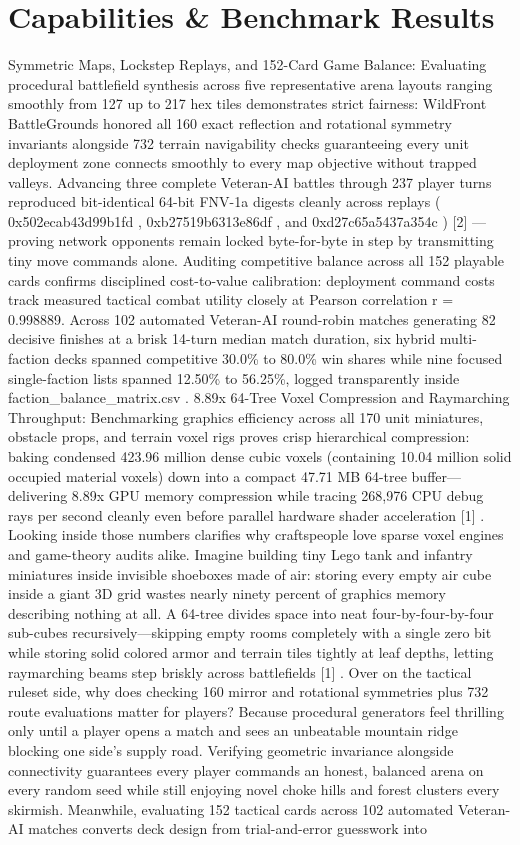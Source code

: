 \documentclass[10pt,letterpaper]{article}
\begin{document}
\section{Capabilities \& Benchmark Results}
Symmetric Maps, Lockstep Replays, and 152-Card Game Balance: Evaluating procedural battlefield synthesis across five representative arena layouts ranging smoothly from 127 up to 217 hex tiles demonstrates strict fairness: WildFront BattleGrounds honored all 160 exact reflection and rotational symmetry invariants alongside 732 terrain navigability checks guaranteeing every unit deployment zone connects smoothly to every map objective without trapped valleys. Advancing three complete Veteran-AI battles through 237 player turns reproduced bit-identical 64-bit FNV-1a digests cleanly across replays ( 0x502ecab43d99b1fd , 0xb27519b6313e86df , and 0xd27c65a5437a354c ) [2] ---proving network opponents remain locked byte-for-byte in step by transmitting tiny move commands alone. Auditing competitive balance across all 152 playable cards confirms disciplined cost-to-value calibration: deployment command costs track measured tactical combat utility closely at Pearson correlation r = 0.998889. Across 102 automated Veteran-AI round-robin matches generating 82 decisive finishes at a brisk 14-turn median match duration, six hybrid multi-faction decks spanned competitive 30.0\% to 80.0\% win shares while nine focused single-faction lists spanned 12.50\% to 56.25\%, logged transparently inside faction\_balance\_matrix.csv . 8.89x 64-Tree Voxel Compression and Raymarching Throughput: Benchmarking graphics efficiency across all 170 unit miniatures, obstacle props, and terrain voxel rigs proves crisp hierarchical compression: baking condensed 423.96 million dense cubic voxels (containing 10.04 million solid occupied material voxels) down into a compact 47.71 MB 64-tree buffer---delivering 8.89x GPU memory compression while tracing 268,976 CPU debug rays per second cleanly even before parallel hardware shader acceleration [1] . Looking inside those numbers clarifies why craftspeople love sparse voxel engines and game-theory audits alike. Imagine building tiny Lego tank and infantry miniatures inside invisible shoeboxes made of air: storing every empty air cube inside a giant 3D grid wastes nearly ninety percent of graphics memory describing nothing at all. A 64-tree divides space into neat four-by-four-by-four sub-cubes recursively---skipping empty rooms completely with a single zero bit while storing solid colored armor and terrain tiles tightly at leaf depths, letting raymarching beams step briskly across battlefields [1] . Over on the tactical ruleset side, why does checking 160 mirror and rotational symmetries plus 732 route evaluations matter for players? Because procedural generators feel thrilling only until a player opens a match and sees an unbeatable mountain ridge blocking one side's supply road. Verifying geometric invariance alongside connectivity guarantees every player commands an honest, balanced arena on every random seed while still enjoying novel choke hills and forest clusters every skirmish. Meanwhile, evaluating 152 tactical cards across 102 automated Veteran-AI matches converts deck design from trial-and-error guesswork into 
\end{document}
